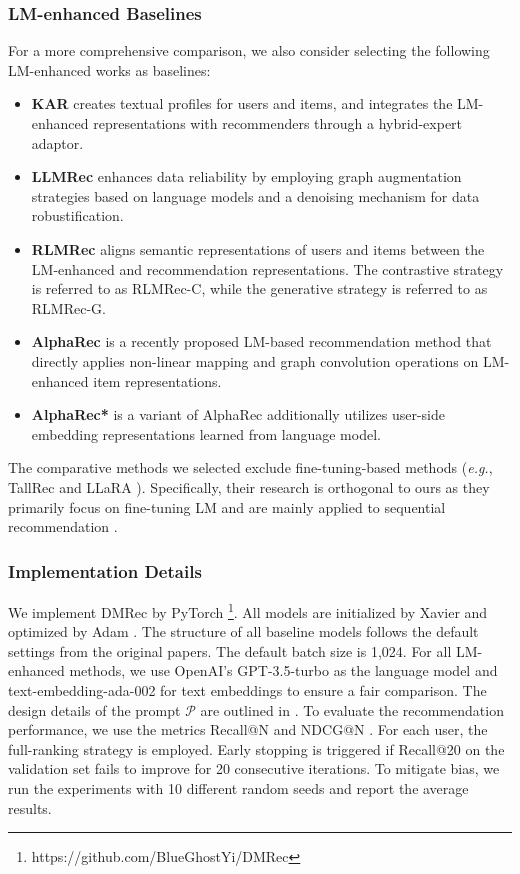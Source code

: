 \documentclass[sigconf]{acmart}
\begin{document}
\subsubsection{\textbf{LM-enhanced Baselines}}
For a more comprehensive comparison, we also consider selecting the following LM-enhanced works as baselines:
\begin{itemize}[leftmargin=*]
    \item \textbf{KAR} \cite{xi2024towards} creates textual profiles for users and items, and integrates the LM-enhanced representations with recommenders through a hybrid-expert adaptor.
    \item \textbf{LLMRec} \cite{wei2024llmrec} enhances data reliability by employing graph augmentation strategies based on language models and a denoising mechanism for data robustification.
    \item \textbf{RLMRec} \cite{ren2024representation} aligns semantic representations of users and items between the LM-enhanced and recommendation representations. The contrastive strategy is referred to as RLMRec-C, while the generative strategy is referred to as RLMRec-G.
    \item \textbf{AlphaRec} \cite{sheng2024language} is a recently proposed LM-based recommendation method that directly applies non-linear mapping and graph convolution operations on LM-enhanced item representations.
    \item \textbf{AlphaRec*} is a variant of AlphaRec \cite{sheng2024language} additionally utilizes user-side embedding representations learned from language model.
\end{itemize}
The comparative methods we selected exclude fine-tuning-based methods (\textit{e.g.}, TallRec \cite{bao2023tallrec} and LLaRA \cite{liao2024llara}). Specifically, their research is orthogonal to ours as they primarily focus on fine-tuning LM and are mainly applied to sequential recommendation \cite{kang2018self}.

\subsubsection{\textbf{Implementation Details}} We implement \textsf{DMRec} by PyTorch \footnote{https://github.com/BlueGhostYi/DMRec}. All models are initialized by Xavier \cite{glorot2010understanding} and optimized by Adam \cite{kingma2014adam}. The structure of all baseline models follows the default settings from the original papers. The default batch size is 1,024. For all LM-enhanced methods, we use OpenAI's GPT-3.5-turbo as the language model and text-embedding-ada-002 \cite{neelakantan2022text} for text embeddings to ensure a fair comparison. The design details of the prompt $\mathcal P$ are outlined in \cite{ren2024representation}. To evaluate the recommendation performance, we use the metrics Recall@N and NDCG@N \cite{he2017neural}. For each user, the full-ranking strategy \cite{he2020lightgcn} is employed. Early stopping is triggered if Recall@20 on the validation set fails to improve for 20 consecutive iterations. To mitigate bias, we run the experiments with 10 different random seeds and report the average results.
\end{document}
